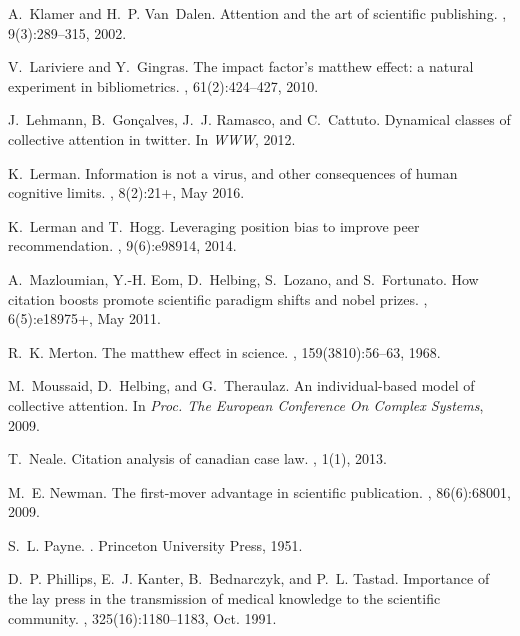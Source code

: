 \documentclass[10pt]{bmc_article}
\begin{document}
\begin{thebibliography}{10}
A.~Klamer and H.~P. Van~Dalen.
\newblock Attention and the art of scientific publishing.
, 9(3):289--315, 2002.

V.~Lariviere and Y.~Gingras.
\newblock The impact factor's matthew effect: a natural experiment in
  bibliometrics.
, 61(2):424--427, 2010.

J.~Lehmann, B.~Gon\c{c}alves, J.~J. Ramasco, and C.~Cattuto.
\newblock Dynamical classes of collective attention in twitter.
\newblock In {\em WWW}, 2012.

K.~Lerman.
\newblock Information is not a virus, and other consequences of human cognitive
  limits.
, 8(2):21+, May 2016.

K.~Lerman and T.~Hogg.
\newblock Leveraging position bias to improve peer recommendation.
, 9(6):e98914, 2014.

A.~Mazloumian, Y.-H. Eom, D.~Helbing, S.~Lozano, and S.~Fortunato.
\newblock How citation boosts promote scientific paradigm shifts and nobel
  prizes.
, 6(5):e18975+, May 2011.

R.~K. Merton.
\newblock The matthew effect in science.
, 159(3810):56--63, 1968.

M.~Moussaid, D.~Helbing, and G.~Theraulaz.
\newblock An individual-based model of collective attention.
\newblock In {\em Proc. The European Conference On Complex Systems}, 2009.

T.~Neale.
\newblock Citation analysis of canadian case law.
, 1(1), 2013.

M.~E. Newman.
\newblock The first-mover advantage in scientific publication.
, 86(6):68001, 2009.

S.~L. Payne.
.
\newblock Princeton University Press, 1951.

D.~P. Phillips, E.~J. Kanter, B.~Bednarczyk, and P.~L. Tastad.
\newblock Importance of the lay press in the transmission of medical knowledge
  to the scientific community.
, 325(16):1180--1183, Oct.
  1991.


\end{thebibliography}
\end{document}
